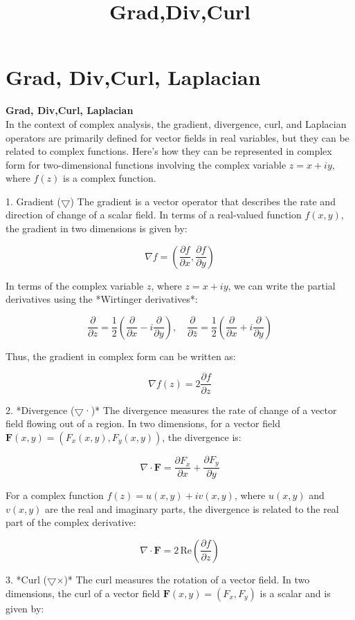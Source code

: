 \documentclass[12pt,a4paper]{article}
\begin{document}
	
	\section{Grad, Div,Curl, Laplacian}
	\title{Grad,Div,Curl} \textbf{Grad, Div,Curl, Laplacian} \\
In the context of complex analysis, the gradient, divergence, curl, and Laplacian operators are primarily defined for vector fields in real variables, but they can be related to complex functions. Here’s how they can be represented in complex form for two-dimensional functions involving the complex variable \( z = x + iy \), where \( f(z) \) is a complex function.

 1. Gradient ($\bigtriangledown$)
The gradient is a vector operator that describes the rate and direction of change of a scalar field. In terms of a real-valued function \( f(x, y) \), the gradient in two dimensions is given by:

\[
\nabla f = \left( \frac{\partial f}{\partial x}, \frac{\partial f}{\partial y} \right)
\]

In terms of the complex variable \( z \), where \( z = x + iy \), we can write the partial derivatives using the *Wirtinger derivatives*:

\[
\frac{\partial}{\partial z} = \frac{1}{2}\left(\frac{\partial}{\partial x} - i\frac{\partial}{\partial y}\right), \quad \frac{\partial}{\partial \bar{z}} = \frac{1}{2}\left(\frac{\partial}{\partial x} + i\frac{\partial}{\partial y}\right)
\]

Thus, the gradient in complex form can be written as:

\[
\nabla f(z) = 2 \frac{\partial f}{\partial z}
\]

 2. *Divergence ($\bigtriangledown$·)*
The divergence measures the rate of change of a vector field flowing out of a region. In two dimensions, for a vector field \( \mathbf{F}(x, y) = (F_x(x, y), F_y(x, y)) \), the divergence is:

\[
\nabla \cdot \mathbf{F} = \frac{\partial F_x}{\partial x} + \frac{\partial F_y}{\partial y}
\]

For a complex function \( f(z) = u(x, y) + iv(x, y) \), where \( u(x, y) \) and \( v(x, y) \) are the real and imaginary parts, the divergence is related to the real part of the complex derivative:

\[
\nabla \cdot \mathbf{F} = 2 \, \text{Re} \left( \frac{\partial f}{\partial z} \right)
\]

3. *Curl ($\bigtriangledown$×)*
The curl measures the rotation of a vector field. In two dimensions, the curl of a vector field \( \mathbf{F}(x, y) = (F_x, F_y) \) is a scalar and is given by:
\end{document}
